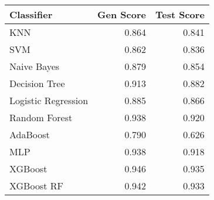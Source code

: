 \begin{tabular}{lrr}
\toprule
Classifier & Gen Score & Test Score \\
\midrule
KNN & 0.864 & 0.841 \\
SVM & 0.862 & 0.836 \\
Naive Bayes & 0.879 & 0.854 \\
Decision Tree & 0.913 & 0.882 \\
Logistic Regression & 0.885 & 0.866 \\
Random Forest & 0.938 & 0.920 \\
AdaBoost & 0.790 & 0.626 \\
MLP & 0.938 & 0.918 \\
XGBoost & 0.946 & 0.935 \\
XGBoost RF & 0.942 & 0.933 \\
\bottomrule
\end{tabular}
